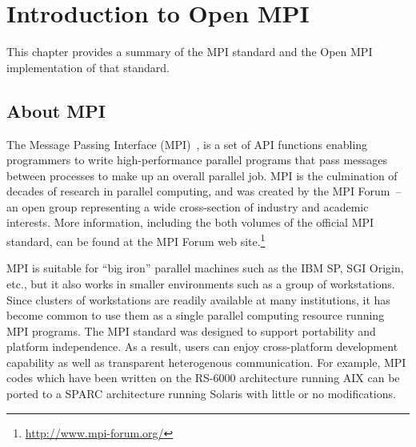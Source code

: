 %
% 
% 
%

\chapter{Introduction to Open MPI}
\label{sec:introduction}

This chapter provides a summary of the MPI standard and the
Open MPI implementation of that standard.

\section{About MPI}

The Message Passing Interface
(MPI)~\cite{geist96:_mpi2_lyon,mpi_forum93:_mpi}, is a set of API
functions enabling programmers to write high-performance parallel
programs that pass messages between processes to make up an
overall parallel job.  MPI is the culmination of decades of research
in parallel computing, and was created by the MPI Forum~-- an open
group representing a wide cross-section of industry and academic
interests.  More information, including the both volumes of the
official MPI standard, can be found at the MPI Forum web
site.\footnote{\url{http://www.mpi-forum.org/}}

MPI is suitable for ``big iron'' parallel machines such as the IBM SP,
SGI Origin, etc., but it also works in smaller environments such as a
group of workstations.  Since clusters of workstations are readily
available at many institutions, it has become common to use them as a
single parallel computing resource running MPI programs.
%
The MPI standard was designed to support portability and platform
independence.  As a result, users can enjoy cross-platform development
capability as well as transparent heterogenous communication.  For
example, MPI codes which have been written on the RS-6000 architecture
running AIX can be ported to a SPARC architecture running Solaris with
little or no modifications.


